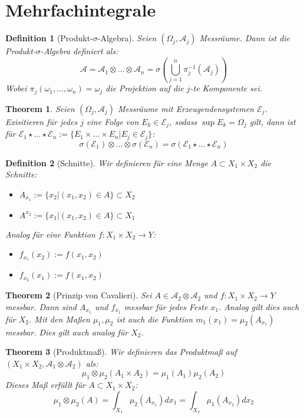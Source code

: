 \documentclass[10pt,a4paper]{article}
\newtheorem{theorem}{Theorem}
\newtheorem{definition}{Definition}
\begin{document}
\section{Mehrfachintegrale}
\begin{definition}[Produkt-$\sigma$-Algebra]
	Seien $(\Omega_j, \mathcal{A}_j)$ Messräume. Dann ist die Produkt-$\sigma$-Algebra definiert als:
	$$\mathcal{A} = \mathcal{A}_1 \otimes ... \otimes \mathcal{A}_n = \sigma(\bigcup_{j=1}^n\pi_j^{-1}(\mathcal{A}_j))$$
	Wobei $\pi_j (\omega_1, ..., \omega_n) = \omega_j$ die Projektion auf die $j$-te Komponente sei.
\end{definition}
\begin{theorem}
	Seien $(\Omega_j, \mathcal{A}_j)$ Messräume mit Erzeugendensystemen $\mathcal{E}_j$. Exisitieren für jedes $j$ eine Folge von $E_k\in \mathcal{E}_j$, sodass $\sup E_k = \Omega_j$ gilt, dann ist für $\mathcal{E}_1 \star ... \star\mathcal{E}_n := \{E_1 \times ... \times E_n | E_j \in \mathcal{E}_j	\}$:
	$$\sigma(\mathcal{E}_1)\otimes ... \otimes \sigma(\mathcal{E}_n) = \sigma(\mathcal{E}_1 \star ... \star\mathcal{E}_n)$$
\end{theorem}
\begin{definition}[Schnitte]
	Wir definieren für eine Menge $A\subset X_1 \times X_2$ die Schnitte:
	\begin{itemize}
		\item $A_{x_1} := \{x_2 | (x_1, x_2) \in A\}\subset X_2$
		\item $A^{x_2} := \{x_1 | (x_1, x_2) \in A\}\subset X_1$ 
	\end{itemize}
	Analog für eine Funktion $f: X_1 \times X_2 \to Y$:
	\begin{itemize}
		\item $f_{x_1}(x_2) := f(x_1, x_2)$
		\item $f_{x_2}(x_1):= f(x_1, x_2)$
	\end{itemize}
\end{definition}
\begin{theorem}[Prinzip von Cavalieri]
	Sei $A\in \mathcal{A}_2\otimes\mathcal{A}_2$ und $f:X_1 \times X_2 \to Y$ messbar. Dann sind  $A_{x_1}$ und $f_{x_1}$ messbar  für jedes Feste $x_1$. Analog gilt dies auch für $X_2$.
	Mit den Maßen $\mu_1, \mu_2$ ist auch die Funktion $m_1 (x_1) = \mu_2(A_{x_1})$ messbar. Dies gilt auch analog für $X_2$.
\end{theorem}
\begin{theorem}[Produktmaß]
	Wir definieren das Produktmaß auf $(X_1\times X_2, \mathcal{A}_1 \otimes \mathcal{A}_2)$ als:
	$$\mu_1\otimes\mu_2(A_1\times A_2) = \mu_1(A_1)\mu_2(A_2)$$
	Dieses Maß erfüllt für $A\subset X_1 \times X_2$:
	$$\mu_1\otimes\mu_2(A) = \int_{X_1} \mu_2(A_{x_1}) dx_1 = \int_{X_2} \mu_1(A_{x_2}) dx_2$$
\end{theorem}
\end{document}
